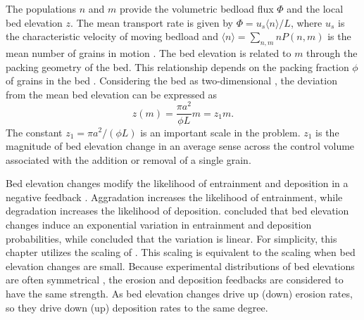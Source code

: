 The populations $n$ and $m$ provide the volumetric bedload flux $\Phi$ and the local bed elevation $z$.
The mean transport rate is given by $\Phi = u_s\langle n \rangle/L$, where $u_s$ is the characteristic velocity of moving bedload and \DIFaddbegin \newline \DIFaddend $\langle n \rangle = 
\sum_{n,m}nP(n,m) $ is the mean number of grains in motion \citep{Charru2004, Ancey2008, Furbish2012a}.
The bed elevation is related to $m$ through the packing geometry of the bed.
This relationship depends on the packing fraction $\phi$ of grains in the bed \citep{Bennett1972}. Considering the bed as two-dimensional \citep{Einstein1950, Paintal1971}, the deviation from the mean bed elevation can be expressed as
\begin{equation} z(m) = \frac{\pi a^2}{\phi L}m = z_1 m. \label{eq:ele}\end{equation}
The constant $z_1 = \pi a^2/(\phi L)$ is an important scale in the problem. 
$z_1$ is the magnitude of bed elevation change in an average sense across the control volume associated with the addition or removal of a single grain.

Bed elevation changes modify the likelihood of entrainment and deposition in a negative feedback \citep{Sawai1987, Wong2007}. Aggradation increases the likelihood of entrainment, while degradation increases the likelihood of deposition.
\citet{Wong2007} concluded that bed elevation changes induce an exponential variation in entrainment and deposition probabilities, while \citet{Sawai1987} concluded that the variation is linear.
For simplicity, this chapter utilizes the scaling of \citet{Sawai1987}. This scaling is equivalent to the  \citet{Wong2007} scaling when bed elevation changes are small.
Because experimental distributions of bed elevations are often symmetrical \DIFdelbegin {}\DIFdelend \DIFaddbegin {}\DIFaddend , the erosion and deposition feedbacks are considered to have the same strength.
As bed elevation changes drive up (down) erosion rates, so they drive down (up) deposition rates to the same degree.


